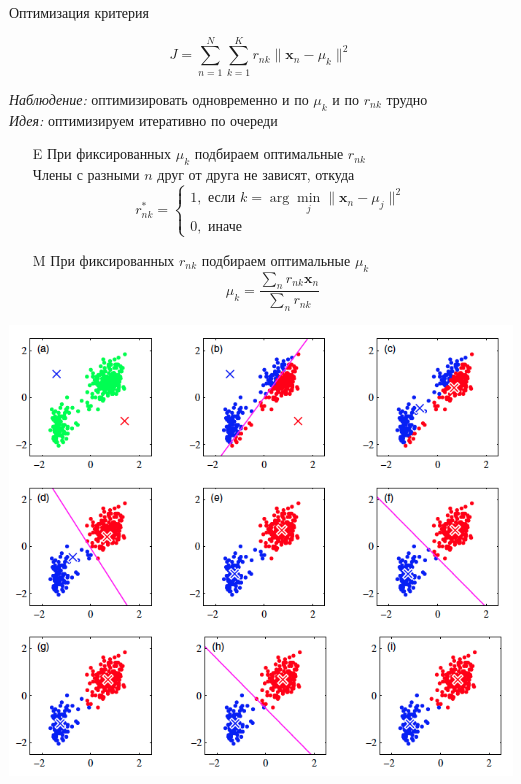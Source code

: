 \documentclass[10pt,a4paper]{beamer}
\begin{document}

\begin{frame}{Оптимизация критерия}

\[
J = \sum_{n=1}^N \sum_{k=1}^K r_{nk} \| \mathbf{x}_n - \mu_k \|^2
\]

{\it Наблюдение:} оптимизировать одновременно и по $\mu_k$ и по $r_{nk}$ трудно \\
{\it Идея:} оптимизируем итеративно по очереди

\begin{itemize}
\item[E] При фиксированных $\mu_k$ подбираем оптимальные $r_{nk}$ \\
Члены с разными $n$ друг от друга не зависят, откуда
\[
r^*_{nk} = \begin{cases} 
1, \text{ если } k = \arg \min_j \| \mathbf{x}_n - \mu_j\|^2 \\
0, \text{ иначе }
\end{cases} 
\]
\item[M] При фиксированных $r_{nk}$ подбираем оптимальные $\mu_k$
\[
\mu_k = \frac{\sum_n r_{nk} \mathbf{x}_n}{\sum_n r_{nk}}
\]
\end{itemize}

\end{frame}


\begin{frame}{}

\begin{center}
\includegraphics[scale=0.35]{images/kmeans.png}
\end{center}

\end{frame}
\end{document}
